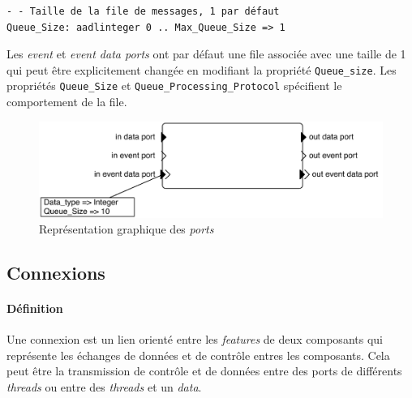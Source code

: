 \documentclass[11pt,a4paper]{paper}
\begin{document}
\begin{appendices}
\begin{center}
 \begin{minipage}[c]{.72\linewidth}
 \lstset{inputencoding=utf8/latin1}
\begin{lstlisting}
- - Taille de la file de messages, 1 par défaut
Queue_Size: aadlinteger 0 .. Max_Queue_Size => 1
\end{lstlisting}
\end{minipage}
\end{center}

Les {\em event} et {\em event data ports} ont par défaut une file associée avec une taille de 1 qui peut être explicitement changée en modifiant la propriété {\tt Queue\_size}. Les propriétés {\tt Queue\_Size} et {\tt Queue\_Processing\_Protocol} spécifient le comportement de la file.

\begin{figure}[htbp]
\begin{center}
\includegraphics[scale=.6]{figures_pdf/ports.pdf}
\caption{Représentation graphique des {\em ports}}
\end{center}
\end{figure}
\FloatBarrier

\subsection{Connexions}

\paragraph{Définition} Une connexion est un lien orienté entre les {\em features} de deux composants qui représente les échanges de données et de contrôle entres les composants. Cela peut être la transmission de contrôle et de données entre des ports de différents {\em threads} ou entre des {\em threads} et un {\em data}.


\end{appendices}
\end{document}
